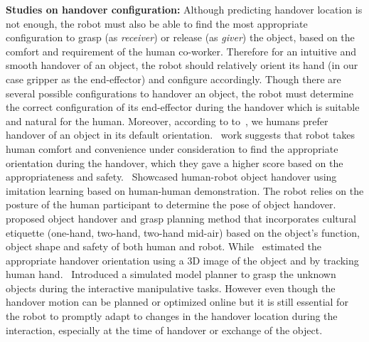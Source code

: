\textbf{Studies on handover configuration:} Although predicting handover location is not enough, the robot must also be able to find the most appropriate configuration to grasp (as \textit{receiver}) or release (as \textit{giver}) the object, based on the comfort and requirement of the human co-worker. Therefore for an intuitive and smooth handover of an object, the robot should relatively orient its hand (in our case gripper as the end-effector) and configure accordingly. Though there are several possible configurations to handover an object, the robot must determine the correct configuration of its end-effector during the handover which is suitable and natural for the human. Moreover, according to to~\cite{cakmak2011human}, we humans prefer handover of an object in its default orientation.~\cite{aleotti2012comfortable} work suggests that robot takes human comfort and convenience under consideration to find the appropriate orientation during the handover, which they gave a higher score based on the appropriateness and safety.~\cite{vogt2018one} Showcased human-robot object handover using imitation learning based on human-human demonstration. The robot relies on the posture of the human participant to determine the pose of object handover. ~\cite{kim2004advanced} proposed object handover and grasp planning method that incorporates cultural etiquette (one-hand, two-hand, two-hand mid-air) based on the object's function, object shape and safety of both human and robot. While~\cite{vezzani2017novel, song2013predicting, micelli2011perception} estimated the appropriate handover orientation using a 3D image of the object and by tracking human hand.~\cite{lopez2006grasp} Introduced a simulated model planner to grasp the unknown objects during the interactive manipulative tasks. However even though the handover motion can be planned or optimized online but it is still essential for the robot to promptly adapt to changes in the handover location during the interaction, especially at the time of handover or exchange of the object.

